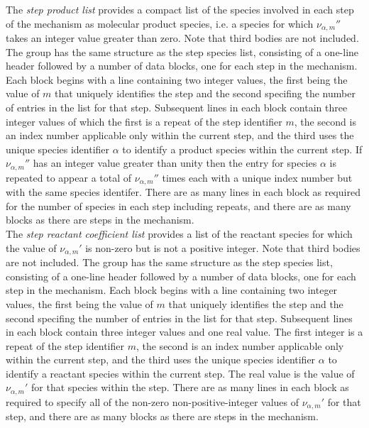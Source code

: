 \documentclass[dvips]{article}
\begin{document}
\noindent
The {\it step product list} provides a compact
list of the species involved in each step of the
mechanism as molecular product species, i.e. a species for which
$\nu_{\alpha,m}''$ takes an integer value greater than zero.
Note that third bodies are not included.
The group has the same
structure as the step species list, consisting of a 
one-line header followed by a number of data blocks, one for each step
in the mechanism.  Each block begins with a line containing two
integer values, the first being the value of $m$ that uniquely
identifies the step and the second specifing the number of entries in
the list for that step.  Subsequent lines in each block contain three
integer values of which the first is a repeat of the step
identifier $m$, the second
is an index number applicable only within the current step, and the
third uses the unique species identifier $\alpha$ to identify a product
species within the current step.  If $\nu_{\alpha,m}''$ has an integer
value greater than unity
then the entry for species $\alpha$ is repeated to appear a total of
$\nu_{\alpha,m}''$ times each with a unique index number but with the same
species identifer.  There are as many lines in each block
as required for the number of species in each step including repeats,
and there are as many blocks as there are steps in the mechanism.\\

\noindent
The {\it step reactant coefficient list} 
provides a list of the reactant species for which the value of 
$\nu_{\alpha,m}'$ is non-zero but is not a positive integer.
Note that third bodies are not included.
The group has the same
structure as the step species list, consisting of a 
one-line header followed by a number of data blocks, one for each step
in the mechanism.  Each block begins with a line containing two
integer values, the first being the value of $m$ that uniquely
identifies the step and the second specifing the number of entries in
the list for that step.  Subsequent lines in each block contain three
integer values and one real value.  The first integer is a repeat of the step
identifier $m$, the second
is an index number applicable only within the current step, and the
third uses the unique species identifier $\alpha$ to identify a reactant
species within the current step.  The real value is the value of
$\nu_{\alpha,m}'$ for that species within the step.  There are as many
lines in each block as required to specify all of the non-zero
non-positive-integer values of $\nu_{\alpha,m}'$ for that step,
and there are as many
blocks as there are steps in the mechanism.\\
\end{document}
